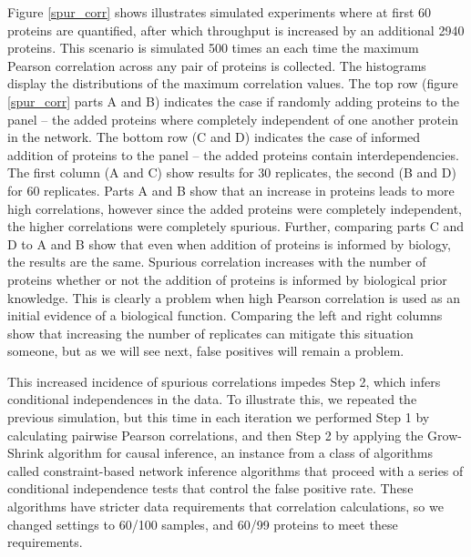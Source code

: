 \documentclass[journal=jacsat,manuscript=article]{achemso}
\def\added#1{{\color{blue} #1}}
\begin{document}
Figure \ref{spur_corr} shows illustrates simulated experiments where at first 60 proteins are quantified, after which throughput is increased by an additional 2940 proteins.  This scenario is simulated 500 times an each time the maximum Pearson correlation across any pair of proteins is collected. The histograms display the distributions of the maximum correlation values.  The top row (figure \ref{spur_corr} parts A and B) indicates the case if randomly adding proteins to the panel -- the added proteins where completely independent of one another protein in the network.  The bottom row (C and D) indicates the case of informed addition of proteins to the panel -- the added proteins contain interdependencies.  The first column (A and C) show results for 30 replicates, the second (B and D) for 60 replicates.  Parts A and B show that an increase in proteins leads to more high correlations, however since the added proteins were completely independent, the higher correlations were completely spurious.  Further, comparing parts C and D to A and B show that even when addition of proteins is informed by biology, the results are the same.  Spurious correlation increases with the number of proteins whether or not the addition of proteins is informed by biological prior knowledge.  This is clearly a problem when high Pearson correlation is used as an initial evidence of a biological function.  Comparing the left and right columns show that increasing the number of replicates can mitigate this situation someone, but as we will see next, false positives will remain a problem.

This increased incidence of spurious correlations impedes Step 2, which \added{infers} conditional independences in the data.  To illustrate this, we repeated the previous simulation, but this time in each iteration we \added{performed Step 1 by calculating pairwise \added{Pearson} correlations, and then Step 2 by applying the Grow-Shrink algorithm \cite{margaritis2003learning} for causal inference, an instance from a class of algorithms called constraint-based network inference algorithms\cite{spirtes2000causation} that proceed with a series of conditional independence tests that control the false positive rate.}   \added{These algorithms have stricter data requirements that correlation calculations, so we changed settings to 60/100 samples, and 60/99 proteins to meet these requirements.}
\end{document}
